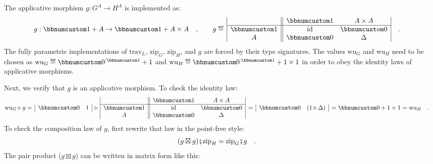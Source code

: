The applicative morphism $g:G^{A}\rightarrow H^{A}$ is implemented
as:
\[
g:\bbnum 1+A\rightarrow\bbnum 1+A\times A\quad,\quad\quad g\triangleq\,\begin{array}{|c||cc|}
 & \bbnum 1 & A\times A\\
\hline \bbnum 1 & \text{id} & \bbnum 0\\
A & \bbnum 0 & \Delta
\end{array}\quad.
\]
The fully parametric implementations of $\text{trav}_{L}$, $\text{zip}_{G}$,
$\text{zip}_{H}$, and $g$ are forced by their type signatures. The
values $\text{wu}_{G}$ and $\text{wu}_{H}$ need to be chosen as
$\text{wu}_{G}\triangleq\bbnum 0^{:\bbnum 1}+1$ and $\text{wu}_{H}\triangleq\bbnum 0^{:\bbnum 1}+1\times1$
in order to obey the identity laws of applicative morphisms.

Next, we verify that $g$ is an applicative morphism. To check the
identity law:
\[
\text{wu}_{G}\triangleright g=\,\begin{array}{|cc|}
\bbnum 0 & 1\end{array}\,\triangleright\,\begin{array}{|c||cc|}
 & \bbnum 1 & A\times A\\
\hline \bbnum 1 & \text{id} & \bbnum 0\\
A & \bbnum 0 & \Delta
\end{array}\,=\,\begin{array}{|cc|}
\bbnum 0 & (1\triangleright\Delta)\end{array}\,=\bbnum 0+1\times1=\text{wu}_{H}\quad.
\]
To check the composition law of $g$, first rewrite that law in the
point-free style:
\begin{equation}
(g\boxtimes g)\bef\text{zip}_{H}=\text{zip}_{G}\bef g\quad.\label{eq:composition-law-applicative-morphism-point-free}
\end{equation}
The pair product ($g\boxtimes g$) can be written in matrix form like
this:

